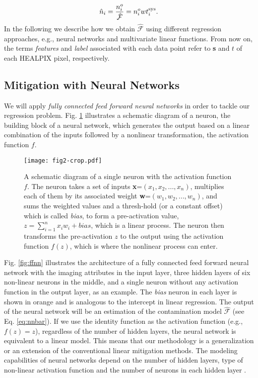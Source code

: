 \documentclass[fleqn, usenatbib]{mnras}
\begin{document}
\begin{align}\label{eq:wsys}
\hat{n}_i = \frac{n^o_i}{\hat{\mathcal{F}}}=n^o_i wt^{{\rm sys}}_{i}.
\end{align}
In the following we describe how we obtain $\hat{\mathcal{F}}$ using different regression approaches, e.g., neural networks and multivariate linear functions. From now on, the terms \textit{features} and \textit{label} associated with each data point refer to \textbf{s} and $t$ of each HEALPIX pixel, respectively. 

\subsection{Mitigation with Neural Networks}\label{subsec:MethodNN}
We will apply {\it fully connected feed forward neural networks} in order to tackle our regression problem. Fig. \ref{fig:perceptron} illustrates a schematic diagram of a neuron, the building block of a neural network, which generates the output based on a linear combination of the inputs followed by a nonlinear transformation, the activation function $f$.\\

\begin{figure}
\texttt{[image: fig2-crop.pdf]}
\caption{A schematic diagram of a single neuron with the activation function $f$. The neuron takes a set of inputs \textbf{x}=$(x_{1}, x_{2},...,x_{n})$, multiplies each of them by its associated weight \textbf{w}=$(w_{1}, w_{2},...,w_{n})$, and sums the weighted values and a thresh-hold (or a constant offset) which is called \textit{bias}, to form a pre-activation value, $z=\sum_{i=1}^{n}x_{i}w_{i} + bias$, which is a linear process. The neuron then transforms the pre-activation $z$ to the output using the activation function $f(z)$, which is where the nonlinear process can enter. }\label{fig:perceptron}
\end{figure}

Fig. \ref{fig:ffnn} illustrates the architecture of a fully connected feed forward neural network with the imaging attributes in the input layer, three hidden layers of six non-linear neurons in the middle, and a single neuron without any activation function in the output layer, as an example. The \textit{bias} neuron in each layer is shown in orange and is analogous to the intercept in linear regression. The output of the neural network will be an estimation of the contamination model $\hat{\mathcal{F}}$ (see Eq. \ref{eq:nnbar}). If we use the identity function as the activation function (e.g., $f(z)=z$), regardless of the number of hidden layers, the neural network is equivalent to a linear model. This means that our methodology is a generalization or an extension of the conventional linear mitigation methods. The modeling capabilities of neural networks depend on the number of hidden layers, type of non-linear activation function and the number of neurons in each hidden layer \citep[see e.g.][]{cybenko1989approximation,hornik1989multilayer,funahashi1989approximate, tamura1997capabilities, huang2003learning, lin2017does, rolnick2017power}.\\
\end{document}

